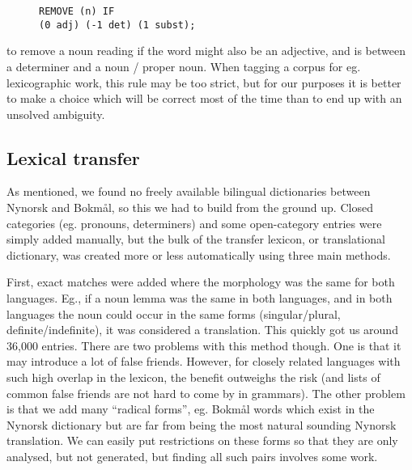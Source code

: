 \documentclass[11pt]{article}
\begin{document}
\begin{figure}[htp] {\tt REMOVE (n) IF\\
    (0 adj) (-1 det) (1 subst);}
\end{figure}

to remove a noun reading if the word might also be an adjective,
and is between a determiner and a noun / proper noun. When tagging a
corpus for eg. lexicographic work, this rule may be too strict, but
for our purposes it is better to make a choice which will be correct
most of the time than to end up with an unsolved ambiguity.

\subsection{Lexical transfer}

As mentioned, we found no freely available bilingual dictionaries
between Nynorsk and Bokmål, so this we had to build from the ground
up. Closed categories (eg. pronouns, determiners) and some
open-category entries were simply added manually, but the bulk of the
transfer lexicon, or translational dictionary, was created more or
less automatically using three main methods.

First, exact matches were added where the morphology was the same for
both languages. Eg., if a noun lemma was the same in both languages,
and in both languages the noun could occur in the same forms
(singular/plural, definite/indefinite), it was considered a
translation. This quickly got us around 36,000 entries. There are two
problems with this method though. One is that it may introduce a lot
of false friends. However, for closely related languages with such
high overlap in the lexicon, the benefit outweighs the risk (and lists
of common false friends are not hard to come by in grammars). The
other problem is that we add many ``radical forms'', eg. Bokmål words
which exist in the Nynorsk dictionary but are far from being the most
natural sounding Nynorsk translation. We can easily put restrictions
on these forms so that they are only analysed, but not generated, but
finding all such pairs involves some work.
\end{document}
